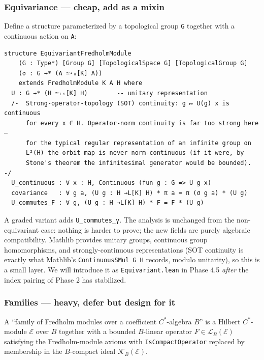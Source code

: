 \documentclass[
  11pt,
]{article}
\begin{document}
\subsubsection{Equivariance --- cheap, add as a
mixin}\label{equivariance-cheap-add-as-a-mixin}

Define a structure parameterized by a topological group \texttt{G}
together with a continuous action on \texttt{A}:

\begin{verbatim}
structure EquivariantFredholmModule
    (G : Type*) [Group G] [TopologicalSpace G] [TopologicalGroup G]
    (σ : G →* (A ≃⋆ₐ[K] A))
    extends FredholmModule K A H where
  U : G →* (H ≃ₗᵢ[K] H)        -- unitary representation
  /-  Strong-operator-topology (SOT) continuity: g ↦ U(g) x is continuous
      for every x ∈ H. Operator-norm continuity is far too strong here —
      for the typical regular representation of an infinite group on
      L²(H) the orbit map is never norm-continuous (if it were, by
      Stone's theorem the infinitesimal generator would be bounded). -/
  U_continuous : ∀ x : H, Continuous (fun g : G => U g x)
  covariance   : ∀ g a, (U g : H →L[K] H) * π a = π (σ g a) * (U g)
  U_commutes_F : ∀ g, (U g : H →L[K] H) * F = F * (U g)
\end{verbatim}

A graded variant adds \texttt{U\_commutes\_γ}. The analysis is unchanged
from the non-equivariant case: nothing is harder to prove; the new
fields are purely algebraic compatibility. Mathlib provides unitary
groups, continuous group homomorphisms, and strongly-continuous
representations (SOT continuity is exactly what Mathlib's
\texttt{ContinuousSMul\ G\ H} records, modulo unitarity), so this is a
small layer. We will introduce it as \texttt{Equivariant.lean} in Phase
4.5 \emph{after} the index pairing of Phase 2 has stabilized.

\subsubsection{Families --- heavy, defer but design for
it}\label{families-heavy-defer-but-design-for-it}

A ``family of Fredholm modules over a coefficient \(C^*\)-algebra
\(B\)'' is a Hilbert \(C^*\)-module \(\mathcal{E}\) over \(B\) together
with a bounded \(B\)-linear operator
\(F \in \mathcal{L}_B(\mathcal{E})\) satisfying the Fredholm-module
axioms with \texttt{IsCompactOperator} replaced by membership in the
\(B\)-compact ideal \(\mathcal{K}_B(\mathcal{E})\).
\end{document}
